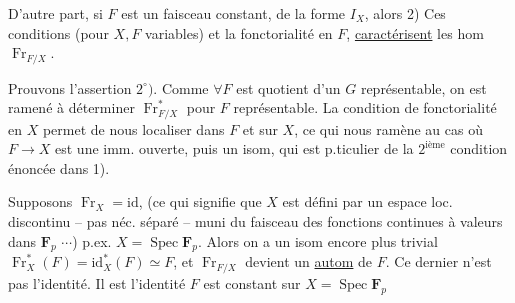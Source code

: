 D'autre part, si $F$ est un faisceau constant, de la forme $I_X$,  alors
2)   Ces conditions (pour $X,F$ variables) et la fonctorialité en $F$, \uline{caractérisent} les hom $\operatorname{Fr}_{F/X}$.

Prouvons l'assertion $2^\circ)$. Comme $\forall F$  est quotient d'un $G$ représentable,  on est ramené à déterminer $\operatorname{Fr}_{F/X}^*$ pour $F$  représentable.
La condition de fonctorialité en $X$   permet de nous localiser dans $F$ et sur $X$, ce qui nous ramène au cas où $F\to X$ est une imm. ouverte, puis un isom, qui est p.ticulier de la $2^{\text{ième}}$ condition énoncée dans 1).

Supposons $\operatorname{Fr}_X=\mathrm{id}$, (ce qui signifie que $X$ est défini par un espace loc.  discontinu -- pas néc. séparé -- muni du faisceau des fonctions continues à valeurs dans $\mathbf F_p$ $\cdots$) p.ex. $X=\operatorname{Spec}\mathbf F_p$. Alors on a un isom encore plus trivial $\operatorname{Fr}_X^*(F)=\mathrm{id}_X^*(F)\simeq F$, et $\operatorname{Fr}_{F/X}$ devient un \uline{autom} de $F$. Ce dernier n'est pas   l'identité. Il est l'identité  $F$ est constant sur $X=\operatorname{Spec}\mathbf F_p$
